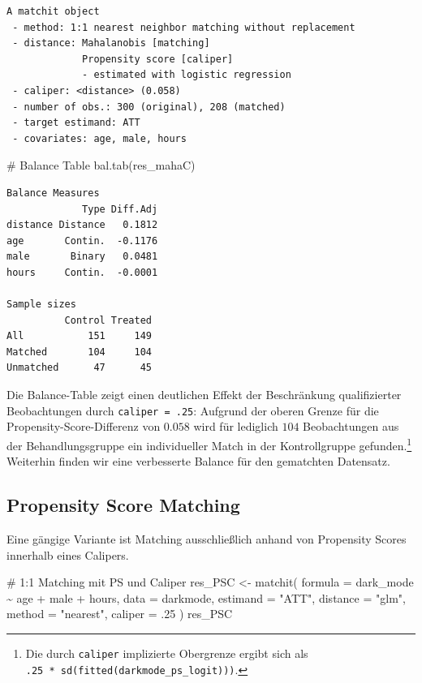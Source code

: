 \documentclass[
  a4paper,
  DIV=11,
  oneside]{scrreprt}
\newenvironment{Shaded}{\begin{snugshade}}{\end{snugshade}}
\newcommand{\AttributeTok}[1]{\textcolor[rgb]{0.40,0.45,0.13}{#1}}
\newcommand{\CommentTok}[1]{\textcolor[rgb]{0.37,0.37,0.37}{#1}}
\newcommand{\DecValTok}[1]{\textcolor[rgb]{0.68,0.00,0.00}{#1}}
\newcommand{\FunctionTok}[1]{\textcolor[rgb]{0.28,0.35,0.67}{#1}}
\newcommand{\NormalTok}[1]{\textcolor[rgb]{0.00,0.23,0.31}{#1}}
\newcommand{\OtherTok}[1]{\textcolor[rgb]{0.00,0.23,0.31}{#1}}
\newcommand{\SpecialCharTok}[1]{\textcolor[rgb]{0.37,0.37,0.37}{#1}}
\newcommand{\StringTok}[1]{\textcolor[rgb]{0.13,0.47,0.30}{#1}}
\begin{document}
\begin{verbatim}
A matchit object
 - method: 1:1 nearest neighbor matching without replacement
 - distance: Mahalanobis [matching]
             Propensity score [caliper]
             - estimated with logistic regression
 - caliper: <distance> (0.058)
 - number of obs.: 300 (original), 208 (matched)
 - target estimand: ATT
 - covariates: age, male, hours
\end{verbatim}

\begin{Shaded}
\begin{Highlighting}[]
\CommentTok{\# Balance Table}
\FunctionTok{bal.tab}\NormalTok{(res\_mahaC)}
\end{Highlighting}
\end{Shaded}

\begin{verbatim}
Balance Measures
             Type Diff.Adj
distance Distance   0.1812
age       Contin.  -0.1176
male       Binary   0.0481
hours     Contin.  -0.0001

Sample sizes
          Control Treated
All           151     149
Matched       104     104
Unmatched      47      45
\end{verbatim}

Die Balance-Table zeigt einen deutlichen Effekt der Beschränkung
qualifizierter Beobachtungen durch \texttt{caliper\ =\ .25}: Aufgrund
der oberen Grenze für die Propensity-Score-Differenz von \(0.058\) wird
für lediglich \(104\) Beobachtungen aus der Behandlungsgruppe ein
individueller Match in der Kontrollgruppe gefunden.\footnote{Die durch
  \texttt{caliper} implizierte Obergrenze ergibt sich als
  \texttt{.25\ *\ sd(fitted(darkmode\_ps\_logit)))}.} Weiterhin finden
wir eine verbesserte Balance für den gematchten Datensatz.

\subsection{Propensity Score Matching}\label{propensity-score-matching}

Eine gängige Variante ist Matching ausschließlich anhand von Propensity
Scores innerhalb eines Calipers.

\begin{Shaded}
\begin{Highlighting}[]
\CommentTok{\# 1:1 Matching mit PS und Caliper}
\NormalTok{res\_PSC }\OtherTok{\textless{}{-}} \FunctionTok{matchit}\NormalTok{(}
  \AttributeTok{formula =}\NormalTok{ dark\_mode }\SpecialCharTok{\textasciitilde{}}\NormalTok{ age }\SpecialCharTok{+}\NormalTok{ male }\SpecialCharTok{+}\NormalTok{ hours, }
  \AttributeTok{data =}\NormalTok{ darkmode, }
  \AttributeTok{estimand =} \StringTok{"ATT"}\NormalTok{,}
  \AttributeTok{distance =} \StringTok{"glm"}\NormalTok{, }
  \AttributeTok{method =} \StringTok{"nearest"}\NormalTok{, }
  \AttributeTok{caliper =}\NormalTok{ .}\DecValTok{25}
\NormalTok{)}
\NormalTok{res\_PSC}
\end{Highlighting}
\end{Shaded}
\end{document}
